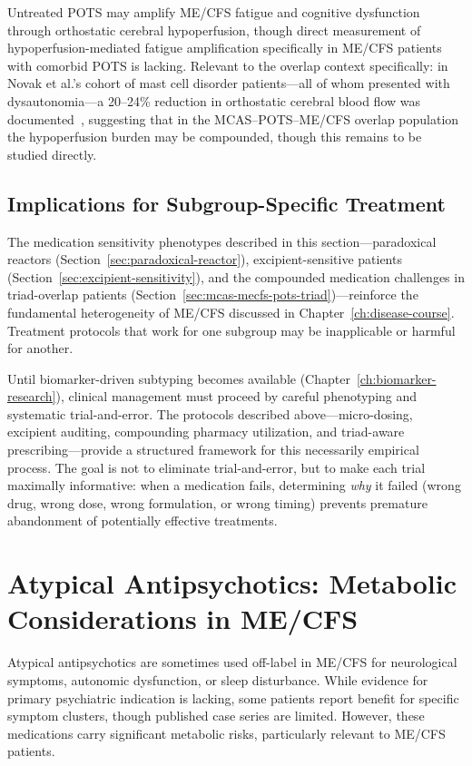 \begin{observation}
Untreated POTS may amplify ME/CFS fatigue and cognitive dysfunction through orthostatic cerebral hypoperfusion, though direct measurement of hypoperfusion-mediated fatigue amplification specifically in ME/CFS patients with comorbid POTS is lacking. Relevant to the overlap context specifically: in Novak et al.'s cohort of mast cell disorder patients---all of whom presented with dysautonomia---a 20--24\% reduction in orthostatic cerebral blood flow was documented~\cite{Novak2022}, suggesting that in the MCAS--POTS--ME/CFS overlap population the hypoperfusion burden may be compounded, though this remains to be studied directly.
\end{observation}

\subsection{Implications for Subgroup-Specific Treatment}
\label{sec:med-sensitivity-subgroups}

The medication sensitivity phenotypes described in this section---paradoxical reactors (Section~\ref{sec:paradoxical-reactor}), excipient-sensitive patients (Section~\ref{sec:excipient-sensitivity}), and the compounded medication challenges in triad-overlap patients (Section~\ref{sec:mcas-mecfs-pots-triad})---reinforce the fundamental heterogeneity of ME/CFS discussed in Chapter~\ref{ch:disease-course}. Treatment protocols that work for one subgroup may be inapplicable or harmful for another.

Until biomarker-driven subtyping becomes available (Chapter~\ref{ch:biomarker-research}), clinical management must proceed by careful phenotyping and systematic trial-and-error. The protocols described above---micro-dosing, excipient auditing, compounding pharmacy utilization, and triad-aware prescribing---provide a structured framework for this necessarily empirical process. The goal is not to eliminate trial-and-error, but to make each trial maximally informative: when a medication fails, determining \emph{why} it failed (wrong drug, wrong dose, wrong formulation, or wrong timing) prevents premature abandonment of potentially effective treatments.

\section{Atypical Antipsychotics: Metabolic Considerations in ME/CFS}
\label{sec:atypical-antipsychotics}

Atypical antipsychotics are sometimes used off-label in ME/CFS for neurological symptoms, autonomic dysfunction, or sleep disturbance. While evidence for primary psychiatric indication is lacking, some patients report benefit for specific symptom clusters, though published case series are limited. However, these medications carry significant metabolic risks, particularly relevant to ME/CFS patients.

